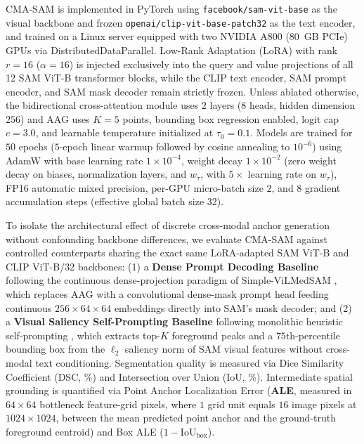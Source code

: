 \documentclass[onecolumn]{IEEEtran}
\numberwithin{equation}{section}
\theoremstyle{definition}
\theoremstyle{remark}
\begin{document}
CMA-SAM is implemented in PyTorch using \texttt{facebook/sam-vit-base} \cite{kirillov2023segment} as the visual backbone and frozen \texttt{openai/\allowbreak clip-vit-\allowbreak base-\allowbreak patch32} \cite{radford2021learning} as the text encoder, and trained on a Linux server equipped with two NVIDIA A800 (80~GB PCIe) GPUs via DistributedDataParallel. Low-Rank Adaptation (LoRA) \cite{zhang2023customized} with rank $r = 16$ ($\alpha = 16$) is injected exclusively into the query and value projections of all 12 SAM ViT-B transformer blocks, while the CLIP text encoder, SAM prompt encoder, and SAM mask decoder remain strictly frozen. Unless ablated otherwise, the bidirectional cross-attention module uses $2$ layers ($8$ heads, hidden dimension $256$) and AAG uses $K = 5$ points, bounding box regression enabled, logit cap $c = 3.0$, and learnable temperature initialized at $\tau_0 = 0.1$. Models are trained for $50$ epochs ($5$-epoch linear warmup followed by cosine annealing to $10^{-6}$) using AdamW \cite{loshchilov2017decoupled} with base learning rate $1 \times 10^{-4}$, weight decay $1 \times 10^{-2}$ (zero weight decay on biases, normalization layers, and $w_\tau$, with $5\times$ learning rate on $w_\tau$), FP16 automatic mixed precision, per-GPU micro-batch size $2$, and $8$ gradient accumulation steps (effective global batch size $32$).

To isolate the architectural effect of discrete cross-modal anchor generation without confounding backbone differences, we evaluate CMA-SAM against controlled counterparts sharing the exact same LoRA-adapted SAM ViT-B and CLIP ViT-B/32 backbones: (1) a \textbf{Dense Prompt Decoding Baseline} following the continuous dense-projection paradigm of Simple-ViLMedSAM \cite{qian2024simplevilmedsam}, which replaces AAG with a convolutional dense-mask prompt head feeding continuous $256 \times 64 \times 64$ embeddings directly into SAM's mask decoder; and (2) a \textbf{Visual Saliency Self-Prompting Baseline} following monolithic heuristic self-prompting \cite{xie2025self, chen2024un}, which extracts top-$K$ foreground peaks and a $75\text{th}$-percentile bounding box from the $\ell_2$ saliency norm of SAM visual features without cross-modal text conditioning. Segmentation quality is measured via Dice Similarity Coefficient (DSC, \%) \cite{milletari2016vnet} and Intersection over Union (IoU, \%). Intermediate spatial grounding is quantified via Point Anchor Localization Error (\textbf{ALE}, measured in $64 \times 64$ bottleneck feature-grid pixels, where $1$ grid unit equals $16$ image pixels at $1024 \times 1024$, between the mean predicted point anchor and the ground-truth foreground centroid) and Box ALE ($1 - \text{IoU}_{\text{box}}$).
\end{document}
